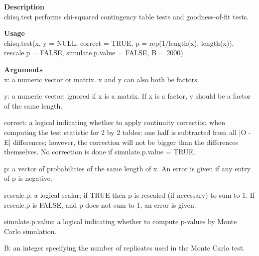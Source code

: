 \documentclass[11pt,a4paper]{ctexart}
\begin{document}
\begin{appendices}
\begin{tcolorbox}[colback=blue!7!white,colframe=blue!40]
\textbf{Description}\\
chisq.test performs chi-squared contingency table tests and goodness-of-fit tests.

\textbf{Usage}\\
chisq.test(x, y = NULL, correct = TRUE,
p = rep(1/length(x), length(x)), rescale.p = FALSE,
simulate.p.value = FALSE, B = 2000)

\textbf{Arguments}\\
x:	a numeric vector or matrix. x and y can also both be factors.

y:	a numeric vector; ignored if x is a matrix. If x is a factor, y should be a factor of the same length.

correct:	a logical indicating whether to apply continuity correction when computing the test statistic for 2 by 2 tables: one half is subtracted from all |O - E| differences; however, the correction will not be bigger than the differences themselves. No correction is done if simulate.p.value = TRUE.

p:	a vector of probabilities of the same length of x. An error is given if any entry of p is negative.

rescale.p:	a logical scalar; if TRUE then p is rescaled (if necessary) to sum to 1. If rescale.p is FALSE, and p does not sum to 1, an error is given.

simulate.p.value:	a logical indicating whether to compute p-values by Monte Carlo simulation.

B:	an integer specifying the number of replicates used in the Monte Carlo test.
\end{tcolorbox}

\end{appendices}
\end{document}
